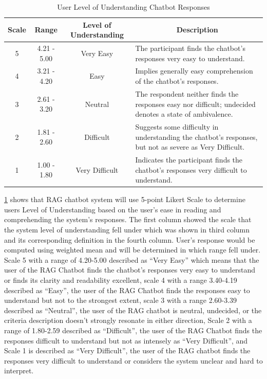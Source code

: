 \begin{refsection}
\begin{table}[H] %
    \centering
    \caption{User Level of Understanding Chatbot Responses}
    \label{tab:understanding_scale}
    \footnotesize
    \begin{tabular}{cccm{7cm}}
        \hline
        \textbf{Scale} & \textbf{Range} & \textbf{Level of Understanding} & \multicolumn{1}{c}{\textbf{Description}} \\
        \hline
        5 & 4.21 - 5.00 & Very Easy & The participant finds the chatbot's responses very easy to understand.\\
        \hline
        4 & 3.21 - 4.20 & Easy & Implies generally easy comprehension of the chatbot's responses.\\
        \hline
        3 & 2.61 - 3.20 & Neutral & The respondent neither finds the responses easy nor difficult; undecided denotes a state of ambivalence.\\
        \hline
        2 & 1.81 - 2.60 & Difficult & Suggests some difficulty in understanding the chatbot's responses, but not as severe as Very Difficult.\\
        \hline
        1 & 1.00 - 1.80 & Very Difficult & Indicates the participant finds the chatbot's responses very difficult to understand.\\
        \hline
    \end{tabular}
\end{table}

\ref{tab:understanding_scale} shows that RAG chatbot system will use 5-point Likert Scale to determine users Level of Understanding based on the user’s ease in reading and comprehending the system’s responses. The first column showed the scale that the system level of understanding fell under which was shown in third column and its corresponding definition in the fourth column. User’s response would be computed using weighted mean and will be determined in which range fell under. Scale 5 with a range of 4.20-5.00 described as “Very Easy” which means that the user of the RAG Chatbot finds the chatbot’s responses very easy to understand or finds its clarity and readability excellent, scale 4 with a range 3.40-4.19 described as “Easy”, the user of the RAG Chatbot finds the responses easy to understand but not to the strongest extent, scale 3 with a range 2.60-3.39 described as “Neutral”, the user of the RAG chatbot is neutral, undecided, or the criteria description doesn’t strongly resonate in either direction, Scale 2 with a range of 1.80-2.59 described as “Difficult”, the user of the RAG Chatbot finds the responses difficult to understand but not as intensely as “Very Difficult”, and Scale 1 is described as “Very Difficult”, the user of the RAG chatbot finds the responses very difficult to understand or considers the system unclear and hard to interpret.


\end{refsection}
